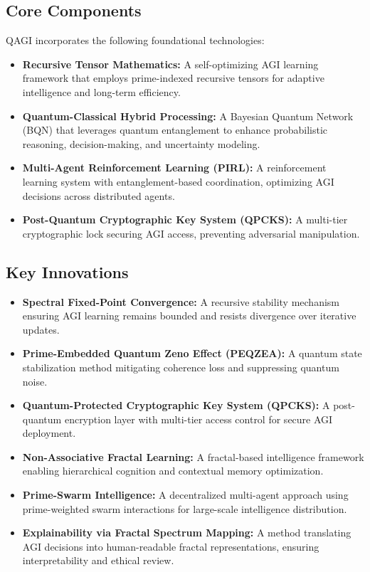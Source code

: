 \documentclass{article}
\theoremstyle{plain}
\theoremstyle{claimstyle}
\begin{document}
\subsection{Core Components}
QAGI incorporates the following foundational technologies:
\begin{itemize}
\item \textbf{Recursive Tensor Mathematics:} A self-optimizing AGI learning framework that employs prime-indexed
      recursive tensors for adaptive intelligence and long-term efficiency.
\item \textbf{Quantum-Classical Hybrid Processing:} A Bayesian Quantum Network (BQN) that leverages quantum
      entanglement to enhance probabilistic reasoning, decision-making, and uncertainty modeling.
\item \textbf{Multi-Agent Reinforcement Learning (PIRL):} A reinforcement learning system with entanglement-based
      coordination, optimizing AGI decisions across distributed agents.
\item \textbf{Post-Quantum Cryptographic Key System (QPCKS):} A multi-tier cryptographic lock securing AGI access,
      preventing adversarial manipulation.
\end{itemize}

\subsection{Key Innovations}
\begin{itemize}
\item \textbf{Spectral Fixed-Point Convergence:} A recursive stability mechanism ensuring AGI learning remains 
      bounded and resists divergence over iterative updates.
\item \textbf{Prime-Embedded Quantum Zeno Effect (PEQZEA):} A quantum state stabilization method mitigating
      coherence loss and suppressing quantum noise.
\item \textbf{Quantum-Protected Cryptographic Key System (QPCKS):} A post-quantum encryption layer with multi-tier
      access control for secure AGI deployment.
\item \textbf{Non-Associative Fractal Learning:} A fractal-based intelligence framework enabling hierarchical
      cognition and contextual memory optimization.
\item \textbf{Prime-Swarm Intelligence:} A decentralized multi-agent approach using prime-weighted swarm interactions
      for large-scale intelligence distribution.
\item \textbf{Explainability via Fractal Spectrum Mapping:} A method translating AGI decisions into human-readable
      fractal representations, ensuring interpretability and ethical review.
\end{itemize}
\end{document}
